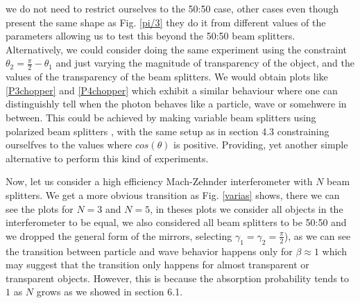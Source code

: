 \documentclass[12pt]{book}
\begin{document}
 we do not need to restrict ourselves to the 50:50 case, other cases even though present the same shape as Fig. \ref{pi/3} they do it from different values of the parameters allowing us to test this beyond the 50:50 beam splitters. Alternatively, we could consider doing the same experiment using the constraint $\theta_{2}=\frac{\pi}{2}-\theta_{1}$ and just varying the magnitude of transparency of the object, and the values of the transparency of the beam splitters. We would obtain plots like \ref{P3chopper} and \ref{P4chopper} which exhibit a similar behaviour where one can distinguishly tell when the photon behaves like a particle, wave or somehwere in between. This could be achieved by making variable beam splitters using polarized beam splitters \cite{variable}, with the same setup as in section 4.3 constraining ourselfves to the values where $cos(\theta)$ is positive. Providing, yet another simple alternative to perform this kind of experiments.

Now, let us consider a high efficiency Mach-Zehnder interferometer with $N$ beam splitters. We get a more obvious transition as Fig. \ref{varias} shows, there we can see the plots for $N=3$ and $N=5$, in theses plots we consider all objects in the interferometer to be equal, we also considered all beam splitters to be 50:50 and we dropped the general form of the mirrors, selecting $\gamma_{1}=\gamma_{2}=\frac{\pi}{2}$), as we can see the transition between particle and wave behavior happens only for $\beta \approx 1$ which may suggest that the transition only happens for almost transparent or transparent objects. However, this is because the absorption probability tends to $1$ as $N$ grows as we showed in section 6.1. 
\end{document}
